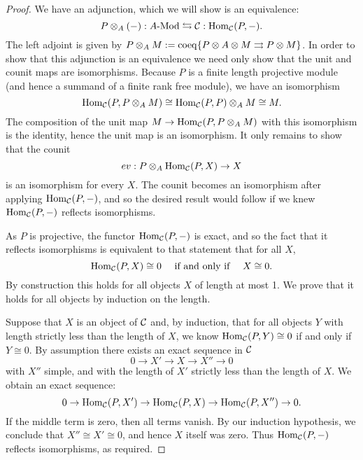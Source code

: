 \documentclass{amsart}
\begin{document}
\begin{proof}
We have an adjunction, which we will show is an equivalence:
	\begin{equation*}
		P \otimes_A (-):\Mod{A}{} \leftrightarrows \cC: \Hom_{\cC}(P,-).
	\end{equation*}
	The left adjoint is given by $P \otimes_A M := \operatorname{coeq}\{ P \otimes A \otimes M \rightrightarrows P \otimes M\}$.  In order to show that this adjunction is an equivalence we need only show that the unit and counit maps are isomorphisms.
Because $P$ is a finite length projective module (and hence a summand of a finite rank free module), we have an isomorphism
\begin{equation*}
	\operatorname{Hom}_{\mathcal C}(P, P \otimes_A M) \cong \operatorname{Hom}_{\mathcal C}(P, P) \otimes_A M \cong M.
\end{equation*}
The composition of the unit map $M \rightarrow\operatorname{Hom}_{\mathcal C}(P, P \otimes_A M)$ with this isomorphism is the identity, hence the unit map is an isomorphism. It only remains to show that the counit 
\begin{equation*}
	ev:P \otimes_A \operatorname{Hom}_{\mathcal C}(P, X) \to X
\end{equation*}
is an isomorphism for every $X$. The counit becomes an isomorphism after applying $\operatorname{Hom}_{\mathcal C}(P,-)$, and so the desired result would follow if we knew $\operatorname{Hom}_{\mathcal C}(P,-)$ reflects isomorphisms. 

As $P$ is projective, the functor $\operatorname{Hom}_{\mathcal C}(P,-)$ is exact, and so the fact that it reflects isomorphisms is equivalent to that statement that for all $X$, 
\begin{equation*}
	\operatorname{Hom}_{\mathcal C}(P,X) \cong 0 \quad \textrm{ if and only if } \quad X \cong 0.
\end{equation*} 
By construction this holds for all objects $X$ of length at most 1. We prove that it holds for all objects by induction on the length. 

Suppose that $X$ is an object of $\mathcal C$ and, by induction, that for all objects $Y$ with length strictly less than the length of $X$, we know $\operatorname{Hom}_{\mathcal C}(P,Y) \cong 0$ if and only if $Y \cong 0$. By assumption there exists an exact sequence in $\mathcal C$
\begin{equation*}
	0 \to X' \to X \to X'' \to 0
\end{equation*}
with $X''$ simple, and with the length of $X'$ strictly less than the length of $X$. We obtain an exact sequence:
\begin{equation*}
	0 \to \operatorname{Hom}_{\mathcal C}(P,X') \to \operatorname{Hom}_{\mathcal C}(P,X) \to \operatorname{Hom}_{\mathcal C}(P,X'') \to 0.
\end{equation*}
If the middle term is zero, then all terms vanish. By our induction hypothesis, we conclude that $X'' \cong X' \cong 0$, and hence $X$ itself was zero. Thus $\operatorname{Hom}_{\mathcal C}(P,-)$ reflects isomorphisms, as required.
\end{proof}
\end{document}
